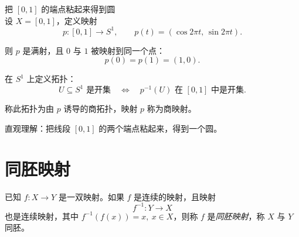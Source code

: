 \begin{example}
把 $[0,1]$ 的端点粘起来得到圆\\
设 $X = [0,1]$，定义映射
\[
p : [0,1] \to S^1, \qquad p(t) = (\cos 2\pi t,\, \sin 2\pi t).
\]

则 $p$ 是满射，且 $0$ 与 $1$ 被映射到同一个点：
\[
p(0) = p(1) = (1,0).
\]

在 $S^1$ 上定义拓扑：
\[
U \subseteq S^1 \text{ 是开集} \quad \Longleftrightarrow \quad p^{-1}(U)
\text{ 在 } [0,1] \text{ 中是开集}.
\]

称此拓扑为由 $p$ 诱导的商拓扑，映射 $p$ 称为商映射。

直观理解：把线段 $[0,1]$ 的两个端点粘起来，得到一个圆。
\end{example}
\section{同胚映射}
\begin{definition}
已知 $f : X \to Y$ 是一双映射。如果 $f$ 是连续的映射，且映射
\[
f^{-1} : Y \to X
\]
也是连续映射，其中 $f^{-1}(f(x)) = x,\ x \in X$，则称 $f$ 是\emph{同胚映射}，称 $X$ 与 $Y$ 同胚。
\end{definition}


